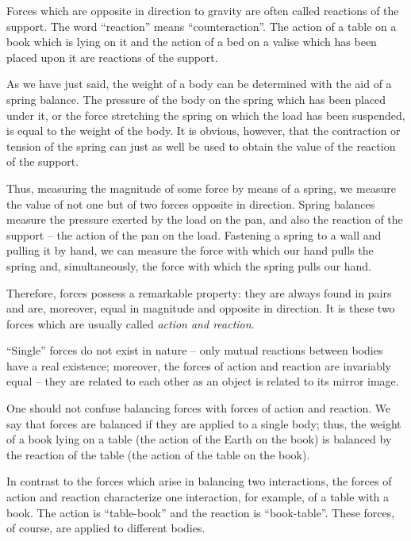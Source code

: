 Forces which are opposite in direction to gravity are
often called reactions of the support. The word ``reaction''
means ``counteraction''. The action of a table on a book
which is lying on it and the action of a bed on a valise
which has been placed upon it are reactions of the support.


As we have just said, the weight of a body can be determined with the
aid of a spring balance. The pressure of the body on the spring which
has been placed under it, or the force stretching the spring on which
the load has been suspended, is equal to the weight of the body. It is
obvious, however, that the contraction or tension of the spring can
just as well be used to obtain the value of the reaction of the
support.  

Thus, measuring the magnitude of some force by means of a
spring, we measure the value of not one but of two forces opposite in
direction. Spring balances measure the pressure exerted by the load on
the pan, and also the reaction of the support -- the action of the pan on
the load. Fastening a spring to a wall and pulling it by
hand, we can measure the force with which our hand pulls
the spring and, simultaneously, the force with which
the spring pulls our hand.

Therefore, forces possess a remarkable property: they
are always found in pairs and are, moreover, equal in
magnitude and opposite in direction. It is these two forces
which are usually called \emph{action and reaction}.


``Single'' forces do not exist in nature -- only mutual reactions
between bodies have a real existence; moreover, the forces of action
and reaction are invariably equal -- they are related to each other as
an object is related to its mirror image.  

One should not confuse
balancing forces with forces of action and reaction. We say that
forces are balanced if they are applied to a single body; thus, the
weight of a book lying on a table (the action of the Earth on the
book) is balanced by the reaction of the table (the action of the
table on the book).  


In contrast to the forces which arise in
balancing two interactions, the forces of action and reaction
characterize one interaction, for example, of a table with a book. The
action is ``table-book'' and the reaction is ``book-table''. These forces,
of course, are applied to different bodies.  

